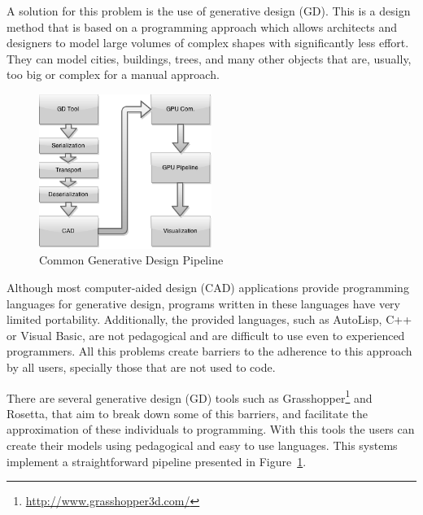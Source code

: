 A solution for this problem is the use of generative design (GD). This is a design method that is based on a programming approach which allows architects and designers to model large volumes of complex shapes with significantly less effort. They can model cities, buildings, trees, and many other objects that are, usually, too big or complex for a manual approach.


\begin{figure}
    \centering
	\includegraphics[width=0.5\textwidth]{img/Architecture/GD-Common-Pipeline.png}
	\caption{Common Generative Design Pipeline}
	\label{fig:GD_Pipeline}
	\vspace{-15pt}
\end{figure}


Although most computer-aided design (CAD) applications provide programming languages for generative design, programs written in these languages have very limited portability. Additionally, the provided languages, such as AutoLisp, C++ or Visual Basic, are not pedagogical and are difficult to use even to experienced programmers. All this problems create barriers to the adherence to this approach by all users, specially those that are not used to code.\cite{ramos_et_al:OASIcs:2014:4565}

There are several generative design (GD) tools such as Grasshopper\footnote{\url{http://www.grasshopper3d.com/}} and Rosetta\cite{Leit2012}, that aim to break down some of this barriers, and facilitate the approximation of these individuals to programming. With this tools the users can create their models using pedagogical and easy to use languages. This systems implement a straightforward pipeline presented in Figure~\ref{fig:GD_Pipeline}.



